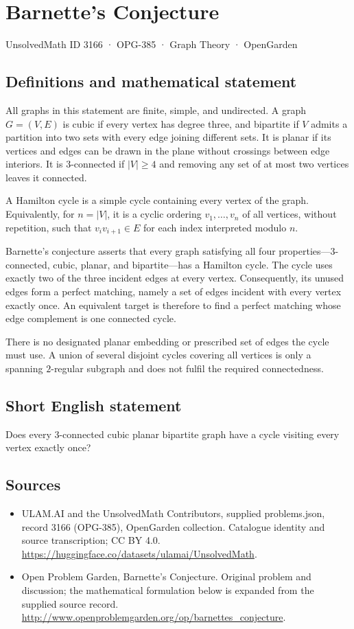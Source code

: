 \documentclass[11pt,a4paper]{article}
\begin{document}
\section*{Barnette's Conjecture}\label{3166}
{\small UnsolvedMath ID 3166 · OPG-385 · Graph Theory · OpenGarden}
\subsection{Definitions and mathematical statement}
All graphs in this statement are finite, simple, and undirected.
A graph $G=(V,E)$ is cubic if every vertex has degree three,
and bipartite if $V$ admits a partition into two sets with
every edge joining different sets. It is planar if its
vertices and edges can be drawn in the plane without crossings
between edge interiors. It is $3$-connected if $|V|\geq4$ and
removing any set of at most two vertices leaves it connected.

A Hamilton cycle is a simple cycle containing every vertex
of the graph. Equivalently, for $n=|V|$, it is a cyclic
ordering $v_1,\ldots,v_n$ of all vertices, without repetition,
such that $v_iv_{i+1}\in E$ for each index interpreted modulo
$n$.

Barnette's conjecture asserts that every graph satisfying
all four properties---$3$-connected, cubic, planar, and
bipartite---has a Hamilton cycle. The cycle uses exactly two
of the three incident edges at every vertex. Consequently,
its unused edges form a perfect matching, namely a set of
edges incident with every vertex exactly once. An equivalent
target is therefore to find a perfect matching whose edge
complement is one connected cycle.

There is no designated planar embedding or prescribed set
of edges the cycle must use. A union of several disjoint
cycles covering all vertices is only a spanning $2$-regular
subgraph and does not fulfil the required connectedness.
\subsection{Short English statement}
Does every 3-connected cubic planar bipartite graph have a cycle visiting every vertex exactly once?
\subsection{Sources}
\begin{itemize}
\item[S1] ULAM.AI and the UnsolvedMath Contributors, supplied problems.json, record 3166 (OPG-385), OpenGarden collection. Catalogue identity and source transcription; CC BY 4.0.
\url{https://huggingface.co/datasets/ulamai/UnsolvedMath}.
\item[S2] Open Problem Garden, Barnette's Conjecture. Original problem and discussion; the mathematical formulation below is expanded from the supplied source record.
\url{http://www.openproblemgarden.org/op/barnettes_conjecture}.
\end{itemize}
\end{document}
